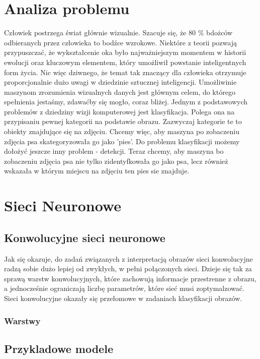 \documentclass[a4paper,twoside,12pt]{book}
\begin{document}
\section{Analiza problemu}
{Człowiek postrzega świat głównie wizualnie. Szacuje się, że 80 \% bdożców odbieranych przez człowieka to bodźce wzrokowe. Niektóre z teorii \cite{bib:nilsson2013eye} pozwają przypuszczać, że wykształcenie oka było najważniejszym momentem w historii ewolucji oraz kluczowym elementem, który umożliwił powstanie inteligentnych form życia. Nic więc dziwnego, że temat tak znaczący dla człowieka otrzymuje proporcjonalnie dużo uwagi w dziedzinie sztucznej inteligencji. Umożliwinie maszynom zrozumienia wizualnych danych jest głównym celem, do którego spełnienia jestaśmy, zdawaćby się mogło, coraz bliżej.}
{Jednym z podstawowych problemów z dziedziny wizji komputerowej jest klasyfikacja. Polega ona na przypisaniu pewnej kategorii na podstawie obrazu. Zazwyczaj kategorie te to obiekty znajdujące się na zdjęciu. Chcemy więc, aby maszyna po zobaczeniu zdjęcia psa skategoryzowała go jako 'pies'. Do problemu klasyfikacji możemy dołożyć jeszcze inny problem - detekcji. Teraz chcemy, aby maszyna bo zobaczeniu zdjęcia psa nie tylko zidentyfkowała go jako psa, lecz również wskazała w którym miejscu na zdjęciu ten pies sie znajduje.}
\section{Sieci Neuronowe}
\subsection{Konwolucyjne sieci neuronowe}
{Jak się okazuje, do zadań związanych z interpretacją obrazów sieci konwolucyjne radzą sobie dużo lepiej od zwykłych, w pełni połączonych sieci. Dzieje się tak za sprawą warstw konwolucyjnych, które zachowują informacje przestrenne z obrazu, a jednocześnie ograniczają liczbę parametrów, które sieć musi zoptymalzować. Sieci konwolucyjne okazały się przełomowe w zadaniach klasyfikacji obrazów. }
\subsubsection{Warstwy}%
\subsection{Przykladowe modele}
\end{document}

